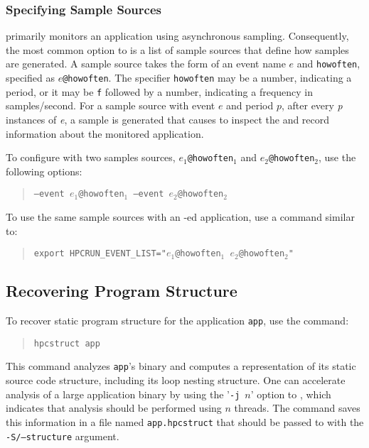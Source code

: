 \documentclass[11pt,letterpaper]{report}
\begin{document}
\subsubsection{Specifying Sample Sources}

\HPCToolkit{} primarily monitors an application using asynchronous sampling.
Consequently, the most common option to \hpcrun{} is a list of sample sources that define how samples are generated.
A sample source takes the form of an event name $e$ and \texttt{howoften}, specified as \texttt{$e$@howoften}. The specifier \texttt{howoften} may
be a number, indicating a period, \eg{}  or it may be \texttt{f} followed by a number,  indicating a frequency in samples/second.
For a sample source with event $e$ and period $p$, after every \emph{p} instances of \emph{e}, a sample is generated that causes \hpcrun{} to inspect the and record information about the monitored application.

To configure \hpcrun{} with two samples sources, \texttt{$e_1$@howoften$_1$} and \texttt{$e_2$@howoften$_2$}, use the following options:
\begin{quote}
  \texttt{--event $e_1$@howoften$_1$ --event $e_2$@howoften$_2$}
\end{quote}
To use the same sample sources with an \hpclink{}-ed application, use a command similar to:
\begin{quote}
  \texttt{export HPCRUN\_EVENT\_LIST="$e_1$@howoften$_1$ $e_2$@howoften$_2$"}
\end{quote}



\subsection{Recovering Program Structure}

To recover static program structure for the application \texttt{app}, use the command:
\begin{quote}
  \verb|hpcstruct app|
\end{quote}
This command analyzes \texttt{app}'s binary and computes a representation of its static source code structure, including its loop nesting structure. One can  accelerate analysis of a large application binary by using the '\verb|-j|~$n$' option to \hpcstruct{}, which indicates that analysis should be performed using $n$ threads.
The command saves this information in a file named \texttt{app.hpcstruct} that should be passed to \hpcprof{} with the \texttt{-S/--structure} argument.
\end{document}

